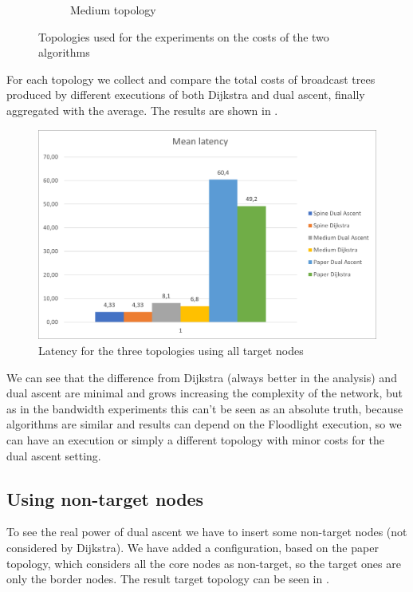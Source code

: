 \begin{figure}
\begin{subfigure}[b]{0.45\textwidth}
		\caption{Medium topology}\label{subfig:mediumtopo}
	\end{subfigure}
	\caption{Topologies used for the experiments on the costs of the two
	algorithms}\label{fig:othertopologies}
\end{figure}

For each topology we collect and compare the total costs of broadcast trees
produced by different executions of both Dijkstra and dual ascent, finally
aggregated with the average. The results are shown in .

\begin{figure}
	\centering
	\includegraphics[width=\textwidth]{img/lat-mean-all.png}
	\caption{Latency for the three topologies using all target
	nodes}\label{fig:avg-latency}
\end{figure}

We can see that the difference from Dijkstra (always better in the analysis) and
dual ascent are minimal and grows increasing the complexity of the network, but
as in the bandwidth experiments this can't be seen as an absolute truth, because
algorithms are similar and results can depend on the Floodlight execution, so we
can have an execution or simply a different topology with minor costs for the
dual ascent setting.

\subsection{Using non-target nodes}

To see the real power of dual ascent we have to insert some non-target nodes
(not considered by Dijkstra). We have added a configuration, based on the paper
topology, which considers all the core nodes as non-target, so the target ones
are only the border nodes. The result target topology can be seen in
.

